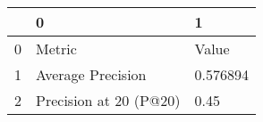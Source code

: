 \begin{tabular}{lll}
\toprule
{} &                       0 &         1 \\
\midrule
0 &                  Metric &     Value \\
1 &       Average Precision &  0.576894 \\
2 &  Precision at 20 (P@20) &      0.45 \\
\bottomrule
\end{tabular}
